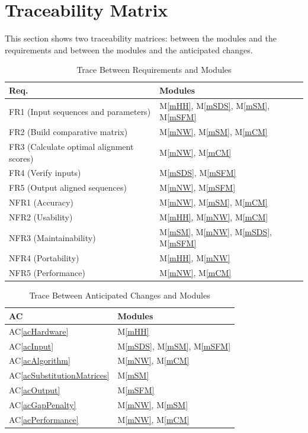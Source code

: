 \documentclass[12pt, titlepage]{article}
\newcommand{\acref}[1]{AC\ref{#1}}
\newcommand{\mref}[1]{M\ref{#1}}
\begin{document}


\section{Traceability Matrix} \label{SecTM}

This section shows two traceability matrices: between the modules and the
requirements and between the modules and the anticipated changes.

\begin{table}[H]
  \centering
  \begin{tabular}{p{} p{}}
  \toprule
  \textbf{Req.} & \textbf{Modules}\\
  \midrule
  FR1 (Input sequences and parameters) & \mref{mHH}, \mref{mSDS}, \mref{mSM}, \mref{mSFM} \\
  FR2 (Build comparative matrix) & \mref{mNW}, \mref{mSM}, \mref{mCM} \\
  FR3 (Calculate optimal alignment scores) & \mref{mNW}, \mref{mCM} \\
  FR4 (Verify inputs) & \mref{mSDS}, \mref{mSFM} \\
  FR5 (Output aligned sequences) & \mref{mNW}, \mref{mSFM} \\
  NFR1 (Accuracy) & \mref{mNW}, \mref{mSM}, \mref{mCM} \\
  NFR2 (Usability) & \mref{mHH}, \mref{mNW}, \mref{mCM} \\
  NFR3 (Maintainability) & \mref{mSM}, \mref{mNW}, \mref{mSDS}, \mref{mSFM} \\
  NFR4 (Portability) & \mref{mHH}, \mref{mNW} \\
  NFR5 (Performance) & \mref{mNW}, \mref{mCM} \\
  \bottomrule
  \end{tabular}
  \caption{Trace Between Requirements and Modules}
  \label{TblRT}
\end{table}


\begin{table}[H]
  \centering
  \begin{tabular}{p{} p{}}
  \toprule
  \textbf{AC} & \textbf{Modules}\\
  \midrule
  \acref{acHardware} & \mref{mHH} \\
  \acref{acInput} & \mref{mSDS}, \mref{mSM}, \mref{mSFM} \\
  \acref{acAlgorithm} & \mref{mNW}, \mref{mCM} \\
  \acref{acSubstitutionMatrices} & \mref{mSM} \\
  \acref{acOutput} & \mref{mSFM} \\
  \acref{acGapPenalty} & \mref{mNW}, \mref{mSM} \\
  \acref{acPerformance} & \mref{mNW}, \mref{mCM} \\
  \bottomrule
  \end{tabular}
  \caption{Trace Between Anticipated Changes and Modules}
  \label{TblACT}
\end{table}
\end{document}
